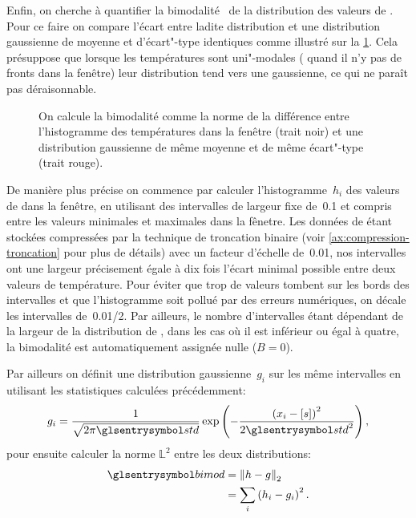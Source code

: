 Enfin, on cherche à quantifier la bimodalité~ de la distribution des valeurs de .
Pour ce faire on compare l'écart entre ladite distribution et une distribution gaussienne de moyenne et d'écart"-type identiques comme illustré sur la \cref{fig:bimodality}.
Cela présuppose que lorsque les températures sont uni"-modales ( quand il n'y pas de fronts dans la fenêtre) leur distribution tend vers une gaussienne, ce qui ne paraît pas déraisonnable.

\begin{figure}
  \centering
  \caption[Illustration du calcul de la bimodalité]{
    On calcule la bimodalité comme la norme de la différence entre l'histogramme des températures dans la fenêtre (trait noir) et une distribution gaussienne de même moyenne et de même écart"-type (trait rouge).
  }
  \label{fig:bimodality}
\end{figure}

De manière plus précise on commence par calculer l'histogramme~\(h_i\) des valeurs de  dans la fenêtre, en utilisant des intervalles de largeur fixe de~\qty{0.1}{\dC} et compris entre les valeurs minimales et maximales dans la fênetre.
Les données de  étant stockées compressées par la technique de troncation binaire (voir \cref{ax:compression-troncation} pour plus de détails) avec un facteur d'échelle de~\qty{0.01}{\dC}, nos intervalles ont une largeur précisement égale à dix fois l'écart minimal possible entre deux valeurs de température.
Pour éviter que trop de valeurs tombent sur les bords des intervalles et que l'histogramme soit pollué par des erreurs numériques, on décale les intervalles de~\qty[parse-numbers=false]{0.01/2}{\dC}.
Par ailleurs, le nombre d'intervalles étant dépendant de la largeur de la distribution de , dans les cas où il est inférieur ou égal à quatre, la bimodalité est automatiquement assignée nulle (\(B=0\)).

Par ailleurs on définit une distribution gaussienne~\(g_i\) sur les même intervalles en utilisant les statistiques calculées précédemment:
\begin{equation}
  g_i = \frac{1}{\sqrt{2\pi\am{std}}} \exp\paren{-\frac{\paren{x_i-\moy{s}}^2}{2\am{std}^2}},
\end{equation}
pour ensuite calculer la norme \(\mathbb{L}^2\) entre les deux distributions:
\begin{equation}
  \begin{split}
  \am{bimod} & = \norme[2]{h - g}\\
             & = \sum_i \paren{h_i - g_i}^2 .
  \end{split}
\end{equation}

